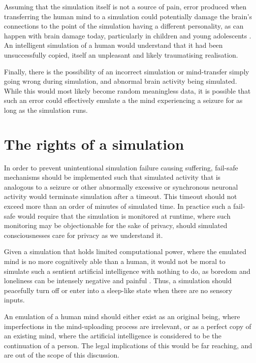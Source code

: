 Assuming that the simulation itself is not a source of pain, error produced when
transferring the human mind to a simulation could potentially damage the brain's
connections to the point of the simulation having a different personality, as
can happen with brain damage today, particularly in children and young
adolescents \autocite{max_personality_2015}. An intelligent simulation of a
human would understand that it had been unsuccessfully copied, itself an
unpleasant and likely traumatising realisation.

Finally, there is the possibility of an incorrect simulation or mind-transfer
simply going wrong during simulation, and abnormal brain activity being
simulated. While this would most likely become random meaningless data, it is
possible that such an error could effectively emulate a the mind
experiencing a seizure for as long as the simulation runs. 
 
\section{The rights of a simulation}

In order to prevent unintentional simulation failure causing suffering, fail-safe
mechanisms should be implemented such that simulated activity that is analogous
to a seizure or other abnormally excessive or synchronous neuronal activity
would terminate simulation after a timeout. This timeout should not exceed more
than an order of minutes of simulated time. In practice such a fail-safe
would require that the simulation is monitored at runtime, where such monitoring
may be objectionable for the sake of privacy, should simulated consciousnesses
care for privacy as we understand it.

Given a simulation that holds limited computational power, where the emulated
mind is no more cognitively able than a human, it would not be moral to simulate
such a sentient artificial intelligence with nothing to do, as boredom and
loneliness can be intensely negative and painful
\autocite{hawkley_loneliness_2010}. Thus, a simulation should peacefully turn
off or enter into a sleep-like state when there are no sensory inputs.

An emulation of a human mind should either exist as an original being, where
imperfections in the mind-uploading process are irrelevant, or as a perfect copy
of an existing mind, where the artificial intelligence is considered to be the
continuation of a person. The legal implications of this would be far reaching,
and are out of the scope of this discussion.



